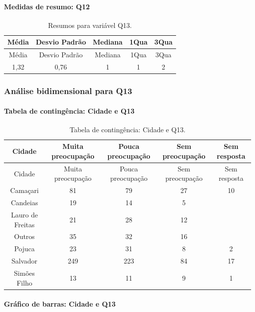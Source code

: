 \documentclass[]{article}
\let\oldparagraph\paragraph
\renewcommand{\paragraph}[1]{\oldparagraph{#1}\mbox{}}
\begin{document}
\hypertarget{medidas-de-resumo-q12-1}{%
\paragraph{Medidas de resumo: Q12}\label{medidas-de-resumo-q12-1}}

\begin{longtable}[]{@{}ccccc@{}}
\caption{\label{tab:unnamed-chunk-54}Resumos para variável Q13.}\tabularnewline
\toprule
Média & Desvio Padrão & Mediana & 1Qua & 3Qua\tabularnewline
\midrule
\endfirsthead
\toprule
Média & Desvio Padrão & Mediana & 1Qua & 3Qua\tabularnewline
\midrule
\endhead
1,32 & 0,76 & 1 & 1 & 2\tabularnewline
\bottomrule
\end{longtable}

\cleardoublepage

\hypertarget{anuxe1lise-bidimensional-para-q13}{%
\subsubsection{Análise bidimensional para Q13}\label{anuxe1lise-bidimensional-para-q13}}

\hypertarget{tabela-de-continguxeancia-cidade-e-q13}{%
\paragraph{Tabela de contingência: Cidade e Q13}\label{tabela-de-continguxeancia-cidade-e-q13}}

\begin{longtable}[]{@{}ccccc@{}}
\caption{\label{tab:unnamed-chunk-55}Tabela de contingência: Cidade e Q13.}\tabularnewline
\toprule
Cidade & Muita preocupação & Pouca preocupação & Sem preocupação & Sem resposta\tabularnewline
\midrule
\endfirsthead
\toprule
Cidade & Muita preocupação & Pouca preocupação & Sem preocupação & Sem resposta\tabularnewline
\midrule
\endhead
Camaçari & 81 & 79 & 27 & 10\tabularnewline
Candeias & 19 & 14 & 5 &\tabularnewline
Lauro de Freitas & 21 & 28 & 12 &\tabularnewline
Outros & 35 & 32 & 16 &\tabularnewline
Pojuca & 23 & 31 & 8 & 2\tabularnewline
Salvador & 249 & 223 & 84 & 17\tabularnewline
Simões Filho & 13 & 11 & 9 & 1\tabularnewline
\bottomrule
\end{longtable}

\hypertarget{gruxe1fico-de-barras-cidade-e-q13}{%
\paragraph{Gráfico de barras: Cidade e Q13}\label{gruxe1fico-de-barras-cidade-e-q13}}
\end{document}
